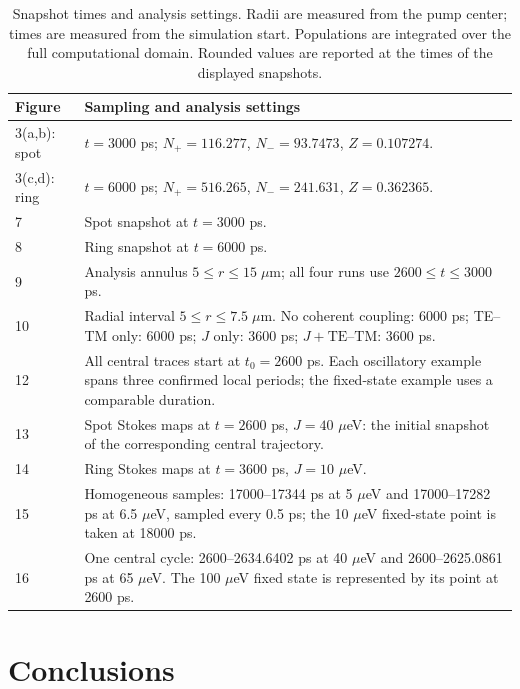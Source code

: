 \documentclass[12pt,a4paper]{article}
\begin{document}
\clearpage
\begingroup\footnotesize\setlength{\tabcolsep}{5pt}\renewcommand{\arraystretch}{1.2}
\begin{longtable}{@{}p{}p{}@{}}
\caption{Snapshot times and analysis settings. Radii are measured from the pump center; times are measured from the simulation start. Populations are integrated over the full computational domain. Rounded values are reported at the times of the displayed snapshots.}\label{tab:sampling}\\
\toprule
Figure & Sampling and analysis settings\\
\midrule
3(a,b): spot & \(t=3000\) ps; \(N_+=116.277\), \(N_-=93.7473\), \(Z=0.107274\).\\
3(c,d): ring & \(t=6000\) ps; \(N_+=516.265\), \(N_-=241.631\), \(Z=0.362365\).\\
7 & Spot snapshot at \(t=3000\) ps.\\
8 & Ring snapshot at \(t=6000\) ps.\\
9 & Analysis annulus \(5\le r\le15\;\mu\mathrm m\); all four runs use \(2600\le t\le3000\) ps.\\
10 & Radial interval \(5\le r\le7.5\;\mu\mathrm m\). No coherent coupling: 6000 ps; TE--TM only: 6000 ps; \(J\) only: 3600 ps; \(J+\mathrm{TE\text{–}TM}\): 3600 ps.\\
12 & All central traces start at \(t_0=2600\) ps. Each oscillatory example spans three confirmed local periods; the fixed-state example uses a comparable duration.\\
13 & Spot Stokes maps at \(t=2600\) ps, \(J=40\) \ensuremath{\mu}eV: the initial snapshot of the corresponding central trajectory.\\
14 & Ring Stokes maps at \(t=3600\) ps, \(J=10\) \ensuremath{\mu}eV.\\
15 & Homogeneous samples: 17000--17344 ps at 5 \ensuremath{\mu}eV and 17000--17282 ps at 6.5 \ensuremath{\mu}eV, sampled every 0.5 ps; the 10 \ensuremath{\mu}eV fixed-state point is taken at 18000 ps.\\
16 & One central cycle: 2600--2634.6402 ps at 40 \ensuremath{\mu}eV and 2600--2625.0861 ps at 65 \ensuremath{\mu}eV. The 100 \ensuremath{\mu}eV fixed state is represented by its point at 2600 ps.\\
\bottomrule
\end{longtable}
\endgroup

\section*{Conclusions}
\end{document}
